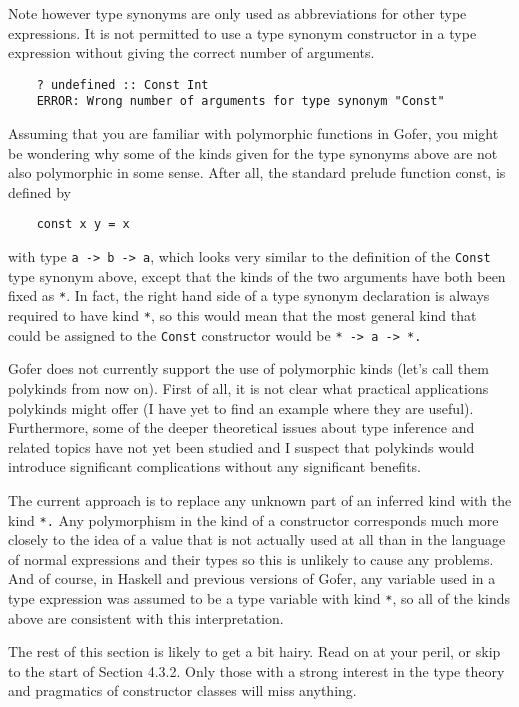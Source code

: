 Note however type synonyms are only used as abbreviations for other
type expressions.  It is not permitted to use a type synonym
constructor in a type expression without giving the correct number of
arguments.
\begin{verbatim}
    ? undefined :: Const Int
    ERROR: Wrong number of arguments for type synonym "Const"
\end{verbatim}  
Assuming that you are familiar with polymorphic functions in Gofer, you
might be wondering why some of the kinds given for the type synonyms
above are not also polymorphic in some sense.  After all, the standard
prelude function const, is defined by
\begin{verbatim}
    const x y = x
\end{verbatim}
with type \verb"a -> b -> a", which looks very similar to the definition of
the \verb"Const" type synonym above, except that the kinds of the two
arguments have both been fixed as \verb"*".  In fact, the right hand side of
a type synonym declaration is always required to have kind \verb"*", so this
would mean that the most general kind that could be assigned to the
\verb"Const" constructor would be \verb"* -> a -> *."

Gofer does not currently support the use of polymorphic kinds (let's
call them polykinds from now on).  First of all, it is not clear what
practical applications polykinds might offer (I have yet to find an
example where they are useful).  Furthermore, some of the deeper
theoretical issues about type inference and related topics have not yet
been studied and I suspect that polykinds would introduce significant
complications without any significant benefits.

The current approach is to replace any unknown part of an inferred kind
with the kind \verb"*."  Any polymorphism in the kind of a constructor
corresponds much more closely to the idea of a value that is not
actually used at all than in the language of normal expressions and
their types so this is unlikely to cause any problems.  And of course,
in Haskell and previous versions of Gofer, any variable used in a type
expression was assumed to be a type variable with kind \verb"*", so all of the
kinds above are consistent with this interpretation.

The rest of this section is likely to get a bit hairy.  Read on at your
peril, or skip to the start of Section 4.3.2.  Only those with a strong
interest in the type theory and pragmatics of constructor classes will
miss anything.

